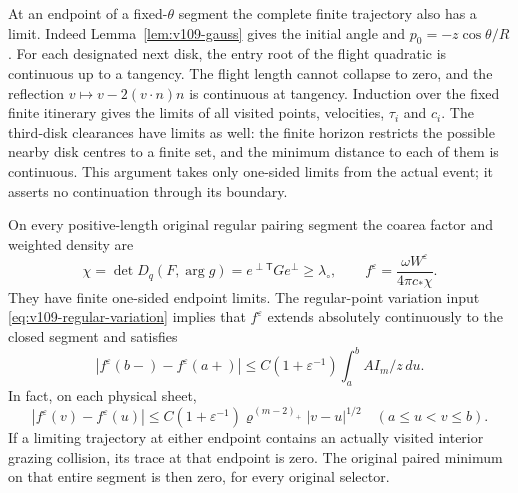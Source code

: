 At an endpoint of a fixed-$\theta$ segment the complete finite
trajectory also has a limit. Indeed Lemma~\ref{lem:v109-gauss}
gives the initial angle and $p_0=-z\cos\theta/R$. For each designated
next disk, the entry root of the flight quadratic is continuous up
to a tangency. The flight length cannot collapse to zero, and the
reflection $v\mapsto v-2(v\cdot n)n$ is continuous at tangency.
Induction over the fixed finite itinerary gives the limits of all
visited points, velocities, $\tau_i$ and $c_i$. The third-disk
clearances have limits as well: the finite horizon restricts the
possible nearby disk centres to a finite set, and the minimum
distance to each of them is continuous. This argument takes only
one-sided limits from the actual event; it asserts no continuation
through its boundary.

\begin{theorem}
\label{thm:v109-traces}
On every positive-length original regular pairing segment the
coarea factor and weighted density are
\begin{equation}\label{eq:v109-chi}
 \chi=\det D_q(F,\arg g)=e^{\perp\mathsf T}G e^\perp
                       \geq\lambda_\circ,
 \qquad f^\varepsilon=\frac{\omega W^\varepsilon}{4\pi c_*\chi}.
\end{equation}
They have finite one-sided endpoint limits. The regular-point
variation input \eqref{eq:v109-regular-variation} implies that
$f^\varepsilon$ extends absolutely continuously to the closed
segment and satisfies
\begin{equation}\label{eq:v109-completed-variation}
 |f^\varepsilon(b-)-f^\varepsilon(a+)|
 \leq C(1+\varepsilon^{-1})
       \int_a^b A I_m/z\,du.
\end{equation}
In fact, on each physical sheet,
\begin{equation}\label{eq:v109-holder}
 |f^\varepsilon(v)-f^\varepsilon(u)|
 \leq C(1+\varepsilon^{-1})\varrho^{(m-2)_+}|v-u|^{1/2}
 \quad(a\leq u<v\leq b).
\end{equation}
If a limiting trajectory at either endpoint contains an actually
visited interior grazing collision, its trace at that endpoint is
zero. The original paired minimum on that entire segment is then
zero, for every original selector.
\end{theorem}
